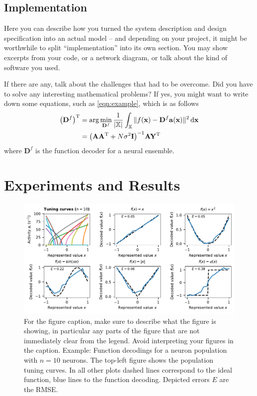 \documentclass[12pt,letterpaper,oneside]{article}
\renewcommand{\vec}[1]{{\mathbf{#1}}}
\newcommand{\mat}[1]{{\mathbf{#1}}}
\newcommand{\T}{\ensuremath{\mathrm{T}}}
\begin{document}
	\subsection{Implementation}

	Here you can describe how you turned the system description and design specification into an actual model -- and depending on your project, it might be worthwhile to split \enquote{implementation} into its own section. You may show excerpts from your code, or a network diagram, or talk about the kind of software you used.

	If there are any, talk about the challenges that had to be overcome. Did you have to solve any interesting mathematical problems? If yes, you might want to write down some equations, such as \cref{eqn:example}, which is as follows
	\begin{align}
		\big(\mat D^f\big)^\T &=  \arg\min_{\mat D^f} \frac{1}{|\mathbb{X}|} \int_{\mathbb{X}}  \| f(\vec x) - \mat D^f \vec a(\vec x)\|^2 \, \mathrm{d}\vec x \notag \\
			&= \big(\mat A \mat A^\T + N \sigma^2 \mat I \big)^{-1} \mat A \mat Y^\T
		\label{eqn:example}
	\end{align}
	where $\mat D^f$ is the function decoder for a neural ensemble.

	\section{Experiments and Results}

	\begin{figure}
		\centering
		\includegraphics{media/function_decodings_10.pdf}
		\caption{For the figure caption, make sure to describe what the figure is showing, in particular any parts of the figure that are not immediately clear from the legend. Avoid interpreting your figures in the caption. Example: Function decodings for a neuron population with $n = 10$ neurons. The top-left figure shows the population tuning curves. In all other plots dashed lines correspond to the ideal function, blue lines to the function decoding. Depicted errors $E$ are the RMSE.}
		\label{fig:function_decodings_10.pdf}
	\end{figure}
\end{document}

